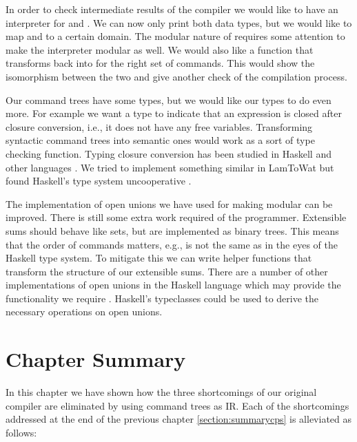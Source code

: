 In order to check intermediate results of the compiler we would like to have an interpreter for  and . We can now only print both data types, but we would like to map  and  to a certain domain. The modular nature of  requires some attention to make the interpreter modular as well. We would also like a function that transforms  back into  for the right set of commands. This would show the isomorphism between the two and give another check of the compilation process.

Our command trees have some types, but we would like our types to do even more. For example we want a type to indicate that an expression is closed after closure conversion, i.e., it does not have any free variables. Transforming syntactic command trees into semantic ones would work as a sort of type checking function. Typing closure conversion has been studied in Haskell and other languages \autocite{DBLP:conf/haskell/GuillemetteM07, DBLP:conf/pldi/Chlipala07, DBLP:conf/popl/MorrisettWCG98}. We tried to implement something similar in LamToWat but found Haskell's type system uncooperative \autocite{10.1145/2578854.2503786}.

The implementation of open unions we have used for making  modular can be improved. There is still some extra work required of the programmer. Extensible sums should behave like sets, but are implemented as binary trees. This means that the order of commands matters, e.g.,  is not the same as  in the eyes of the Haskell type system. To mitigate this we can write helper functions that transform the structure of our extensible sums. There are a number of other implementations of open unions in the Haskell language which may provide the functionality we require \autocite{extensible-effects, open-union}. Haskell's typeclasses could be used to derive the necessary operations on open unions.

\section{\label{section:summarytree}Chapter Summary}
In this chapter we have shown how the three shortcomings of our original compiler are eliminated by using command trees as IR. Each of the shortcomings addressed at the end of the previous chapter \ref{section:summarycps} is alleviated as follows: 


